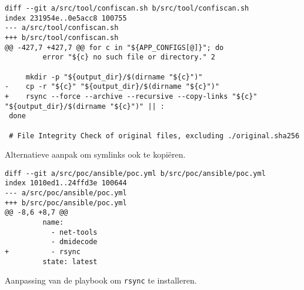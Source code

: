 \begin{listing}
  \begin{verbatim}
diff --git a/src/tool/confiscan.sh b/src/tool/confiscan.sh
index 231954e..0e5acc8 100755
--- a/src/tool/confiscan.sh
+++ b/src/tool/confiscan.sh
@@ -427,7 +427,7 @@ for c in "${APP_CONFIGS[@]}"; do
         error "${c} no such file or directory." 2

     mkdir -p "${output_dir}/$(dirname "${c}")"
-    cp -r "${c}" "${output_dir}/$(dirname "${c}")"
+    rsync --force --archive --recursive --copy-links "${c}" "${output_dir}/$(dirname "${c}")" || :
 done

 # File Integrity Check of original files, excluding ./original.sha256
  \end{verbatim}
  \caption[Kopi\"{e}ren van symlinks.]{Alternatieve aanpak om symlinks ook te kopi\"{e}ren.}
  \label{lst:bijlage-rsync-copy-alternative-diff}
\end{listing}

\begin{listing}
  \begin{verbatim}
diff --git a/src/poc/ansible/poc.yml b/src/poc/ansible/poc.yml
index 1010ed1..24ffd3e 100644
--- a/src/poc/ansible/poc.yml
+++ b/src/poc/ansible/poc.yml
@@ -8,6 +8,7 @@
         name:
           - net-tools
           - dmidecode
+          - rsync
         state: latest
  \end{verbatim}
  \caption[Installatie van rsync via playbook.]{Aanpassing van de playbook om \texttt{rsync} te installeren.}
  \label{lst:bijlage-rsync-playbook-diff}
\end{listing}

